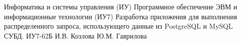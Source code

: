 \documentclass{bmstu}
\begin{document}
\makecourseworktitle
{Информатика и системы управления (ИУ)}
{Программное обеспечение ЭВМ и информационные технологии (ИУ7)}
{Разработка приложения для выполнения распределенного запроса, использующего данные из PostgreSQL и MySQL СУБД.}
{ИУ7-62Б}
{И.В. Козлова}
{Ю.М. Гаврилова}{}{}

\setcounter{page}{3}




\maketableofcontents















\end{document}

